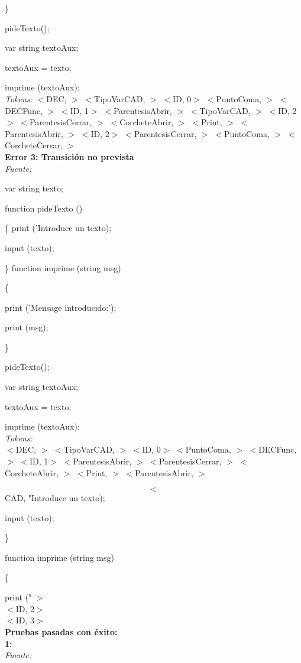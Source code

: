 \documentclass[a4paper, 12pt]{article}
\begin{document}
\} 

 pideTexto(); 
 
var string textoAux;

textoAux = texto;

imprime (textoAux);\medskip\\
\emph{Tokens:} 
 $<$DEC, $>$ 
 $<$TipoVarCAD, $>$ 
 $<$ID, 0$>$ 
 $<$PuntoComa, $>$
 $<$DECFunc, $>$  
 $<$ID, 1$>$ 
 $<$ParentesisAbrir, $>$ 
 $<$TipoVarCAD, $>$
 $<$ID, 2$>$ 
 $<$ParentesisCerrar, $>$ 
 $<$CorcheteAbrir, $>$ 
 $<$Print, $>$ 
 $<$ParentesisAbrir, $>$ 
 $<$ID, 2$>$ 
 $<$ParentesisCerrar, $>$ 
 $<$PuntoComa, $>$ 
 $<$CorcheteCerrar, $>$\bigskip \\
\textbf{Error 3: Transición no prevista}\medskip \\
\emph{Fuente:}

var string texto;

function pideTexto ()

\{
	print ('Introduce un texto);
	
	input (texto);
	
\}
function imprime (string msg)

\{

	print ('Mensage introducido:');
	
	print (msg);
	
\}

pideTexto();

var string textoAux;

textoAux = texto;

imprime (textoAux);\medskip\\
\emph{Tokens:}\\
 $<$DEC, $>$ 
 $<$TipoVarCAD, $>$ 
 $<$ID, 0$>$ 
 $<$PuntoComa, $>$ 
 $<$DECFunc, $>$ 
 $<$ID, 1$>$ 
 $<$ParentesisAbrir, $>$ 
 $<$ParentesisCerrar, $>$ 
 $<$CorcheteAbrir, $>$ 
 $<$Print, $>$ 
 $<$ParentesisAbrir, $>$ 
 
$$<$$CAD, "\textnormal{Introduce un texto);} 
 
	input (texto);
	
\} 

\textnormal{function imprime (string msg)}

\{ 

	print (" $>$
 \\$<$ID, 2$>$ 
 \\$<$ID, 3$>$ \bigskip \\
\textbf{Pruebas pasadas con éxito:}\medskip\\
\textbf{1:}\smallskip\\
\emph{Fuente:} \smallskip
\end{document}
